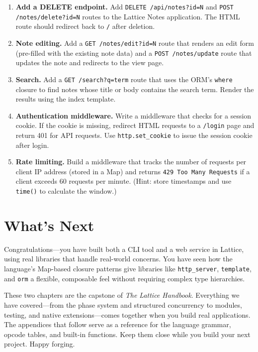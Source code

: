 \begin{enumerate}
  \item \textbf{Add a DELETE endpoint.}
  Add \lstinline|DELETE /api/notes?id=N| and \lstinline|POST /notes/delete?id=N| routes to the Lattice Notes application.
  The HTML route should redirect back to \texttt{/} after deletion.

  \item \textbf{Note editing.}
  Add a \lstinline|GET /notes/edit?id=N| route that renders an edit form (pre-filled with the existing note data) and a \lstinline|POST /notes/update| route that updates the note and redirects to the view page.

  \item \textbf{Search.}
  Add a \lstinline|GET /search?q=term| route that uses the ORM's \lstinline|where| closure to find notes whose title or body contains the search term.
  Render the results using the index template.

  \item \textbf{Authentication middleware.}
  Write a middleware that checks for a session cookie.
  If the cookie is missing, redirect HTML requests to a \lstinline|/login| page and return 401 for API requests.
  Use \lstinline|http.set_cookie| to issue the session cookie after login.

  \item \textbf{Rate limiting.}
  Build a middleware that tracks the number of requests per client IP address (stored in a Map) and returns \lstinline|429 Too Many Requests| if a client exceeds 60 requests per minute.
  (Hint: store timestamps and use \lstinline|time()| to calculate the window.)
\end{enumerate}

\section*{What's Next}\label{sec:web-whats-next}

Congratulations---you have built both a CLI tool and a web service in Lattice, using real libraries that handle real-world concerns.
You have seen how the language's Map-based closure patterns give libraries like \lstinline|http_server|, \lstinline|template|, and \lstinline|orm| a flexible, composable feel without requiring complex type hierarchies.

These two chapters are the capstone of \emph{The Lattice Handbook}.
Everything we have covered---from the phase system and structured concurrency to modules, testing, and native extensions---comes together when you build real applications.
The appendices that follow serve as a reference for the language grammar, opcode tables, and built-in functions.
Keep them close while you build your next project.
Happy forging.
